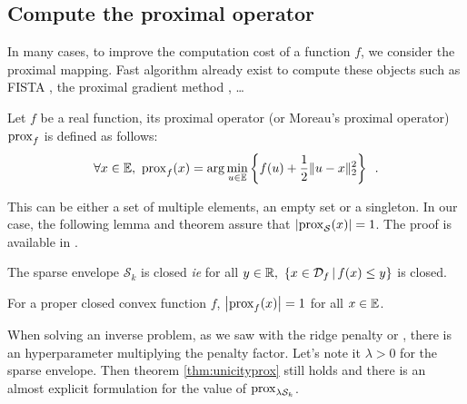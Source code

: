 
\subsection[Proximal operator]{Compute the proximal operator}

In many cases, to improve the computation cost of a function $f$, we consider the proximal mapping. Fast algorithm already exist to compute these objects such as FISTA \cite{beck2009fast}, the proximal gradient method \cite{ryu2017proximal}, \dots

\begin{definition}\label{def:prox}
Let $f$ be a real function, its proximal operator (or Moreau's proximal operator) $\operatorname{prox}_f$ is defined as follows:
\[\forall x\in\mathbb{E},\ \operatorname{prox}_f(x) =\arg\min_{u\in \mathbb{E}}\left\{f(u) + \frac{1}{2}\|u-x\|^2_2\right\}\enspace.\] 
\end{definition}

This can be either a set of multiple elements, an empty set or a singleton. In our case, the following lemma and theorem assure that $\left|\operatorname{prox}_{\mathcal{S}}(x)\right| = 1$. The proof is available in \cite{beck}.

\begin{lemma}
The sparse envelope $\mathcal{S}_k$ is closed \emph{ie} for all $y \in \RR,\ \left\{x\in \mathcal{D}_f\, |\, f(x)\leq y\right\}$ is closed.
\end{lemma}
\begin{theorem}\label{thm:unicityprox}
For a proper closed convex function $f$, $\left|\operatorname{prox}_f(x)\right| = 1$ for all $x\in\mathbb{E}$.
\end{theorem}

When solving an inverse problem, as we saw with the ridge penalty or \enet, there is an hyperparameter multiplying the penalty factor. Let's note it $\lambda>0$ for the sparse envelope. Then theorem \ref{thm:unicityprox} still holds and there is an almost explicit formulation for the value of $\operatorname{prox}_{\lambda\mathcal{S}_k}$.

